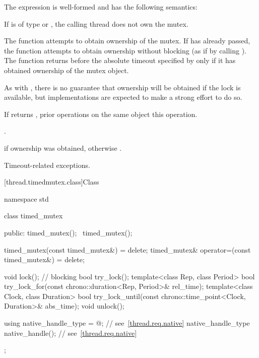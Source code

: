 \pnum
The expression  is well-formed
and has the following semantics:

\begin{itemdescr}
\pnum
\expects
If  is of type  or
, the calling thread does not own the
mutex.

\pnum
\effects
The function attempts to obtain ownership of the mutex. If
 has already passed, the function attempts to obtain ownership
without blocking (as if by calling ). The function
returns before the absolute timeout specified by
 only if it has obtained ownership of the mutex object.
\begin{note}
As with , there is no guarantee that ownership will
be obtained if the lock is available, but implementations are expected to make a
strong effort to do so.
\end{note}

\pnum
\sync
If  returns , prior 
operations on the same object 
this operation.

\pnum
\returntype {}.

\pnum
\returns
{} if ownership was obtained, otherwise .

\pnum
\throws
Timeout-related exceptions.
\end{itemdescr}

[thread.timedmutex.class]{Class }

%
\begin{codeblock}
namespace std {
  class timed_mutex {
  public:
    timed_mutex();
    ~timed_mutex();

    timed_mutex(const timed_mutex&) = delete;
    timed_mutex& operator=(const timed_mutex&) = delete;

    void lock();    // blocking
    bool try_lock();
    template<class Rep, class Period>
      bool try_lock_for(const chrono::duration<Rep, Period>& rel_time);
    template<class Clock, class Duration>
      bool try_lock_until(const chrono::time_point<Clock, Duration>& abs_time);
    void unlock();

    using native_handle_type = @\impdefnc@;          // see~\ref{thread.req.native}
    native_handle_type native_handle();                         // see~\ref{thread.req.native}
  };
}
\end{codeblock}

